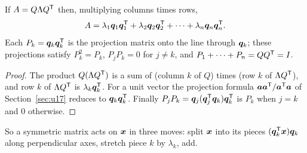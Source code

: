 \begin{corollary}\label{cor:u29-projections}
If $A=Q\Lambda Q^{\mathsf{T}}$ then, multiplying columns times rows,
\[
  A=\lambda_1\boldsymbol{q}_1\boldsymbol{q}_1^{\mathsf{T}}+\lambda_2\boldsymbol{q}_2\boldsymbol{q}_2^{\mathsf{T}}+\cdots+\lambda_n\boldsymbol{q}_n\boldsymbol{q}_n^{\mathsf{T}} .
\]
Each $P_k=\boldsymbol{q}_k\boldsymbol{q}_k^{\mathsf{T}}$ is the projection matrix onto the line through $\boldsymbol{q}_k$; these
projections satisfy $P_k^2=P_k$, $P_jP_k=0$ for $j\ne k$, and $P_1+\cdots+P_n=QQ^{\mathsf{T}}=I$.
\end{corollary}
\begin{proof}
The product $Q(\Lambda Q^{\mathsf{T}})$ is a sum of (column $k$ of $Q$) times (row $k$ of $\Lambda Q^{\mathsf{T}}$),
and row $k$ of $\Lambda Q^{\mathsf{T}}$ is $\lambda_k\boldsymbol{q}_k^{\mathsf{T}}$. For a unit vector the projection formula
$\boldsymbol{a}\boldsymbol{a}^{\mathsf{T}}/\boldsymbol{a}^{\mathsf{T}}\boldsymbol{a}$ of Section~\ref{sec:u17} reduces to $\boldsymbol{q}_k\boldsymbol{q}_k^{\mathsf{T}}$. Finally
$P_jP_k=\boldsymbol{q}_j(\boldsymbol{q}_j^{\mathsf{T}}\boldsymbol{q}_k)\boldsymbol{q}_k^{\mathsf{T}}$ is $P_k$ when $j=k$ and $0$ otherwise.
\end{proof}

So a symmetric matrix acts on $\boldsymbol{x}$ in three moves: split $\boldsymbol{x}$ into its pieces
$(\boldsymbol{q}_k^{\mathsf{T}}\boldsymbol{x})\boldsymbol{q}_k$ along perpendicular axes, stretch piece $k$ by $\lambda_k$, add.


